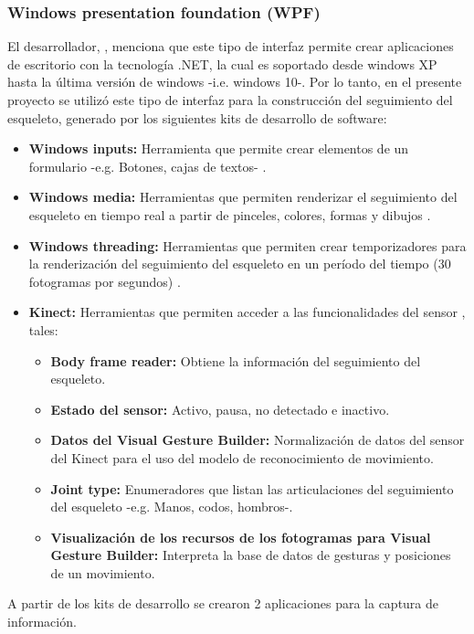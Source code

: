 \subsubsection{Windows presentation foundation (WPF)}
\label{ins:UI:wpf}
El desarrollador, , menciona que este tipo de interfaz permite crear aplicaciones de escritorio con la tecnolog\'ia .NET, la cual es soportado desde windows XP hasta la \'ultima versi\'on de windows -i.e. windows 10-. Por lo tanto, en el presente proyecto se utiliz\'o este tipo de interfaz para la construcci\'on del seguimiento del esqueleto, generado por los siguientes kits de desarrollo de software:
\begin{itemize}
	\item \textbf{Windows inputs:} Herramienta que permite crear elementos de un formulario -e.g. Botones, cajas de textos- \cite{wpfWindows2019}.
	\item \textbf{Windows media:} Herramientas que permiten renderizar el seguimiento del esqueleto en tiempo real a partir de pinceles, colores, formas y dibujos \cite{WindowMedia2019}.
	\item \textbf{Windows threading:} Herramientas que permiten crear temporizadores para la renderizaci\'on del seguimiento del esqueleto en un per\'iodo del tiempo (30 fotogramas por segundos) \cite{WindowThreading2019}.
	\item \textbf{Kinect:} Herramientas que permiten acceder a las funcionalidades del sensor \cite{WindowKinect2019}, tales:
	\begin{itemize}
					\item \textbf{Body frame reader:} Obtiene la informaci\'on del seguimiento del esqueleto.
				\item \textbf{Estado del sensor:} Activo, pausa, no detectado e inactivo.
				\item \textbf{Datos del Visual Gesture Builder:} Normalizaci\'on de datos del sensor del Kinect para el uso del modelo de reconocimiento de movimiento.
			\item \textbf{Joint type:} Enumeradores que listan las articulaciones del seguimiento del esqueleto -e.g. Manos, codos, hombros-.
			\item \textbf{Visualizaci\'on de los recursos de los fotogramas para Visual Gesture Builder:} Interpreta la base de datos de gesturas y posiciones de un movimiento.
	\end{itemize}	 
\end{itemize}
A partir de los kits de desarrollo se crearon 2 aplicaciones para la captura de informaci\'on.
